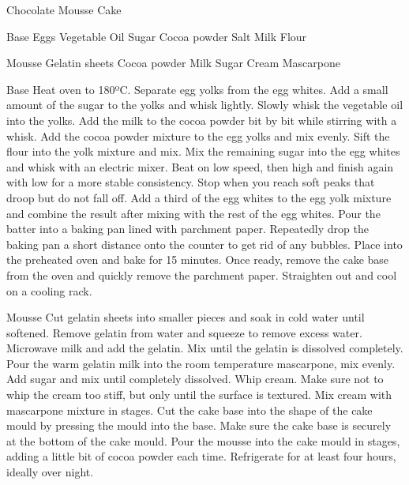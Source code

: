\documentclass[10pt, a4paper]{article}
\begin{document}
	\begin{recipe}{Chocolate Mousse Cake}
		\begin{ingredients}[2]
			\begin{ingredientgroup}{Base}
				 Eggs
				 Vegetable Oil
				 Sugar
				 Cocoa powder
				 Salt
				 Milk
				 Flour
			\end{ingredientgroup}
			\begin{ingredientgroup}{Mousse}
				 Gelatin sheets
				 Cocoa powder
				\ingredient{125g} Milk
				\ingredient{70g} Sugar
				\ingredient{175g} Cream
				 Mascarpone
			\end{ingredientgroup}
		\end{ingredients}
		\begin{procedure}
			\begin{proceduregroup}{Base}
				\step Heat oven to 180ºC.
				\step Separate egg yolks from the egg whites.
				\step Add a small amount of the sugar to the yolks and whisk lightly.
				\step Slowly whisk the vegetable oil into the yolks.
				\step Add the milk to the cocoa powder bit by bit while stirring with a whisk.
				\step Add the cocoa powder mixture to the egg yolks and mix evenly.
				\step Sift the flour into the yolk mixture and mix.
				\step Mix the remaining sugar into the egg whites and whisk with an electric mixer. Beat on low speed, then high and finish again with low for a more stable consistency. Stop when you reach soft peaks that droop but do not fall off.
				\step Add a third of the egg whites to the egg yolk mixture and combine the result after mixing with the rest of the egg whites.
				\step Pour the batter into a baking pan lined with parchment paper. Repeatedly drop the baking pan a short distance onto the counter to get rid of any bubbles.
				\step Place into the preheated oven and bake for 15 minutes.
				\step Once ready, remove the cake base from the oven and quickly remove the parchment paper. Straighten out and cool on a cooling rack.
			\end{proceduregroup}
			\begin{proceduregroup}{Mousse}
				\step Cut gelatin sheets into smaller pieces and soak in cold water until softened.
				\step Remove gelatin from water and squeeze to remove excess water.
				\step Microwave milk and add the gelatin. Mix until the gelatin is dissolved completely.
				\step Pour the warm gelatin milk into the room temperature mascarpone, mix evenly.
				\step Add sugar and mix until completely dissolved.
				\step Whip cream. Make sure not to whip the cream too stiff, but only until the surface is textured.
				\step Mix cream with mascarpone mixture in stages.
				\step Cut the cake base into the shape of the cake mould by pressing the mould into the base.
				\step Make sure the cake base is securely at the bottom of the cake mould.
				\step Pour the mousse into the cake mould in stages, adding a little bit of cocoa powder each time.
				\step Refrigerate for at least four hours, ideally over night.
			\end{proceduregroup}
		\end{procedure}
	\end{recipe}
\end{document}
